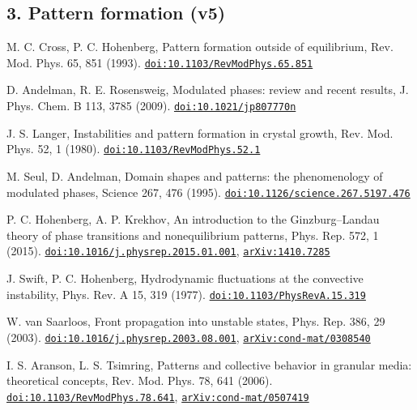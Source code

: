 \documentclass[11pt,a4paper]{article}
\begin{document}
\subsection*{3. Pattern formation (v5)}
\begin{description}[leftmargin=2.6em,labelwidth=2.2em,labelsep=0.4em,itemsep=1pt,parsep=0pt,font=\normalfont]
\item[{[1]}] M. C. Cross, P. C. Hohenberg, Pattern formation outside of equilibrium, Rev. Mod. Phys. 65, 851 (1993). \href{https://doi.org/10.1103/RevModPhys.65.851}{\nolinkurl{doi:10.1103/RevModPhys.65.851}}
\item[{[2]}] D. Andelman, R. E. Rosensweig, Modulated phases: review and recent results, J. Phys. Chem. B 113, 3785 (2009). \href{https://doi.org/10.1021/jp807770n}{\nolinkurl{doi:10.1021/jp807770n}}
\item[{[3]}] J. S. Langer, Instabilities and pattern formation in crystal growth, Rev. Mod. Phys. 52, 1 (1980). \href{https://doi.org/10.1103/RevModPhys.52.1}{\nolinkurl{doi:10.1103/RevModPhys.52.1}}
\item[{[4]}] M. Seul, D. Andelman, Domain shapes and patterns: the phenomenology of modulated phases, Science 267, 476 (1995). \href{https://doi.org/10.1126/science.267.5197.476}{\nolinkurl{doi:10.1126/science.267.5197.476}}
\item[{[5]}] P. C. Hohenberg, A. P. Krekhov, An introduction to the Ginzburg–Landau theory of phase transitions and nonequilibrium patterns, Phys. Rep. 572, 1 (2015). \href{https://doi.org/10.1016/j.physrep.2015.01.001}{\nolinkurl{doi:10.1016/j.physrep.2015.01.001}}, \href{https://arxiv.org/abs/1410.7285}{\nolinkurl{arXiv:1410.7285}}
\item[{[6]}] J. Swift, P. C. Hohenberg, Hydrodynamic fluctuations at the convective instability, Phys. Rev. A 15, 319 (1977). \href{https://doi.org/10.1103/PhysRevA.15.319}{\nolinkurl{doi:10.1103/PhysRevA.15.319}}
\item[{[7]}] W. van Saarloos, Front propagation into unstable states, Phys. Rep. 386, 29 (2003). \href{https://doi.org/10.1016/j.physrep.2003.08.001}{\nolinkurl{doi:10.1016/j.physrep.2003.08.001}}, \href{https://arxiv.org/abs/cond-mat/0308540}{\nolinkurl{arXiv:cond-mat/0308540}}
\item[{[8]}] I. S. Aranson, L. S. Tsimring, Patterns and collective behavior in granular media: theoretical concepts, Rev. Mod. Phys. 78, 641 (2006). \href{https://doi.org/10.1103/RevModPhys.78.641}{\nolinkurl{doi:10.1103/RevModPhys.78.641}}, \href{https://arxiv.org/abs/cond-mat/0507419}{\nolinkurl{arXiv:cond-mat/0507419}}

\end{description}
\end{document}
